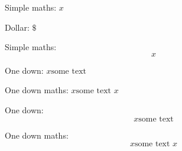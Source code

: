 \documentclass{article}
\begin{document}
Simple maths: $x$

Dollar: $\$ $

Simple maths: $$x$$

One down: $x \text{some text}$

One down maths: $x \text{some text $x$}$

One down: $$x \text{some text}$$

One down maths: $$x \text{some text $x$}$$
\end{document}
